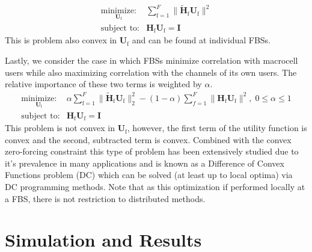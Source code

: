 \documentclass[12pt,a4paper]{report}
\begin{document}
    \begin{equation}
    \begin{array}{ll}
    \underset{\mathbf{U}_{\mathrm{f}} }{\text{minimize:}}   & \sum^F_{\text{f}=1} \|\mathbf{\tilde{H}}_{\mathrm{f}}  \mathbf{U_{\mathrm{f}}}\|^2
    \\
    \mbox{subject to:} & \mathbf{H}_{\mathrm{f}} \mathbf{U_{\mathrm{f}}} = \mathbf{I}
    \end{array}
    \label{e-opt-prob}
    \end{equation}
This is problem also convex in $\mathbf{U}_{\mathrm{f}}$ and can be found at individual FBSs.

\par
Lastly, we consider the case in which FBSs minimize correlation with macrocell users while also maximizing correlation with the channels of its own users. The relative importance of these two terms is weighted by $\alpha.$
    \begin{equation}
    \begin{array}{ll}
    \underset{\mathbf{U}_{\mathrm{f}} }{\text{minimize:}}   & \alpha\sum^F_{\text{f}=1} \|\mathbf{\tilde{H}}_{\mathrm{f}}  \mathbf{U_{\mathrm{f}}}\|^2_2
    -
    (1-\alpha)\sum^F_{f=1} \|\mathbf{H}_{\mathrm{f}}  \mathbf{U_{\mathrm{f}}}\|^2, \; 0\leq \alpha \leq 1
    \\
    \mbox{subject to:} & \mathbf{H}_{\mathrm{f}}  \mathbf{U_{\mathrm{f}}} = \mathbf{I}
    \end{array}
    \label{e-opt-prob}
    \end{equation}
    This problem is not convex in $\mathbf{U}_{\mathrm{f}}$, however, the first term of the utility function is convex and the second, subtracted term is convex. Combined with the convex zero-forcing constraint this type of problem has been extensively studied due to it's prevalence in many applications and is known as a Difference of Convex Functions problem (DC) which can be solved (at least up to local optima) via DC programming methods. Note that as this optimization if performed locally at a FBS, there is not restriction to distributed methods.
     


\chapter{Simulation and Results}\label{numerical}
\end{document}
